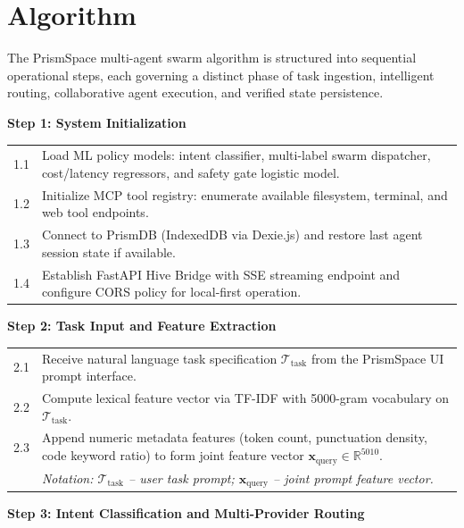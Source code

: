 \documentclass[12pt,a4paper]{report}
\begin{document}
\section{Algorithm}
The PrismSpace multi-agent swarm algorithm is structured into sequential operational steps, each governing a distinct phase of task ingestion, intelligent routing, collaborative agent execution, and verified state persistence.

\vspace{6pt}
\noindent\textbf{Step 1: System Initialization}
\vspace{4pt}

\noindent\begin{tabular}{p{1cm} p{12.5cm}}
1.1 & Load ML policy models: intent classifier, multi-label swarm dispatcher, cost/latency regressors, and safety gate logistic model. \\
1.2 & Initialize MCP tool registry: enumerate available filesystem, terminal, and web tool endpoints. \\
1.3 & Connect to PrismDB (IndexedDB via Dexie.js) and restore last agent session state if available. \\
1.4 & Establish FastAPI Hive Bridge with SSE streaming endpoint and configure CORS policy for local-first operation. \\
\end{tabular}

\clearpage
\noindent\textbf{Step 2: Task Input and Feature Extraction}
\vspace{4pt}

\noindent\begin{tabular}{p{1cm} p{12.5cm}}
2.1 & Receive natural language task specification $\mathcal{T}_{\text{task}}$ from the PrismSpace UI prompt interface. \\
2.2 & Compute lexical feature vector via TF-IDF with 5000-gram vocabulary on $\mathcal{T}_{\text{task}}$. \\
2.3 & Append numeric metadata features (token count, punctuation density, code keyword ratio) to form joint feature vector $\mathbf{x}_{\text{query}} \in \mathbb{R}^{5010}$. \\
 & \textit{Notation: $\mathcal{T}_{\text{task}}$ -- user task prompt; $\mathbf{x}_{\text{query}}$ -- joint prompt feature vector.} \\
\end{tabular}

\vspace{8pt}
\noindent\textbf{Step 3: Intent Classification and Multi-Provider Routing}
\vspace{4pt}
\end{document}
